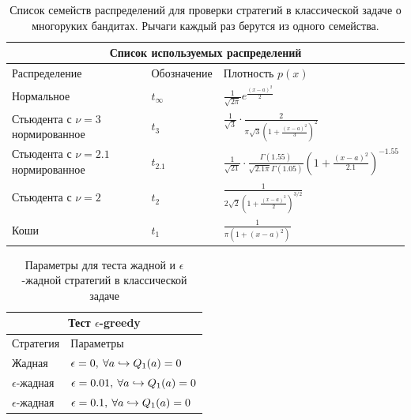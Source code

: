 \begin{table}
\centering
\renewcommand{\arraystretch}{1.5}
\begin{tabular}{ |m{4cm}||m{2.1cm}|m{6cm}|  }
 \hline
 \multicolumn{3}{|c|}{Список используемых распределений} \\
 \hline
 Распределение & Обозначение & Плотность $p(x)$ \\
 \hline
  Нормальное   &  $t_{\infty} $&  $\frac{1}{\sqrt{2\pi}}e^{\frac{(x-a)^2}{2}}$ \\
 \hline
 Стьюдента с $\nu=3$ нормированное & $t_{3}$ & $\frac{1}{\sqrt{3}} \cdot \frac{2}{\pi \sqrt{3} \left( 1 + \frac{(x-a)^2}{3} \right)^2}$ \\
 \hline
 Стьюдента с $\nu=2.1$ нормированное & $t_{2.1}$ & $\frac{1}{\sqrt{21}} \cdot \frac{\Gamma(1.55)}{\sqrt{2.1 \pi} \Gamma(1.05)} \left( 1 + \frac{(x-a)^2}{2.1} \right)^{-1.55}$ \\
 \hline
 Стьюдента с $\nu=2$ & $t_2$ & $\frac{1}{2\sqrt{2} \left( 1 + \frac{(x-a)^2}{2} \right)^{3/2}}$ \\
 \hline
 Коши & $t_1$ & $\frac{1}{\pi(1+(x-a)^2)}$ \\
 \hline
\end{tabular}
\caption{Список семейств распределений для проверки стратегий в классической задаче о многоруких бандитах. Рычаги каждый раз берутся из одного семейства.}
\label{table:classic_distribution_family}
\end{table}

\begin{table}
\centering
\renewcommand{\arraystretch}{1.3}
\begin{tabular}{ |m{3cm}|m{5cm}|  }
 \hline
 \multicolumn{2}{|c|}{Тест $\epsilon$-greedy} \\
 \hline
 Стратегия & Параметры \\
 \hline
  Жадная   &  $\epsilon = 0, \: \forall a \hookrightarrow Q_1(a) = 0$ \\
 \hline
 $\epsilon$-жадная & $\epsilon = 0.01, \: \forall a \hookrightarrow Q_1(a) = 0$ \\
 \hline
 $\epsilon$-жадная & $\epsilon = 0.1, \: \forall a \hookrightarrow Q_1(a) = 0$ \\
 \hline
\end{tabular}
\caption{Параметры для теста жадной и $\epsilon$-жадной стратегий в классической задаче}
\label{table:classic_greedy}
\end{table}


